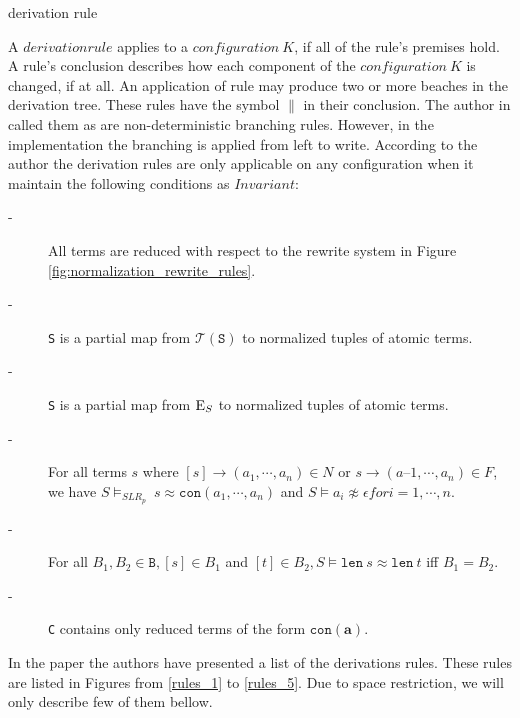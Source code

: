 \begin{definition}{derivation rule}
\end{definition}
A $derivation rule$ applies to a $configuration\ K$, if all of the rule's premises hold. A rule's conclusion describes how each component of the $configuration\ K$ is changed, if at all. An application of rule may produce two or more beaches in the derivation tree. These rules have the symbol $\parallel$ in their conclusion. The author in \cite{main-paper} called them as are non-deterministic branching rules.
However, in the implementation the branching is applied from left to write. According to the author the derivation rules are only applicable on any configuration when it maintain the following conditions as $Invariant$:
\begin{description}			
\item[-] All terms are reduced with respect to the rewrite system in Figure \ref{fig:normalization_rewrite_rules}.
\item[-] \texttt{S} is a partial map from  $\mathcal{T}(\texttt{S})$ to normalized tuples of atomic terms.
\item[-] \texttt{S} is a partial map from \( \textnormal{E}_S \) to normalized tuples of atomic terms.
\item[-] For all terms $s$ where $[s] \to (a_1,\cdots,a_n) \in N$ or $s \to (a–1,\cdots,a_n) \in F$, we have $S \models_{SLR_p} \  s \approx \texttt{con}(a_1,\cdots,a_n)$ and $S \models a_i \not\approx \epsilon for i = 1,\cdots,n $.
\item[-] For all $B_1, B_2 \in \texttt{B}, [s] \in B_1$ and $[t] \in B_2, S \models \texttt{len} \ s \approx \texttt{len} \ t$ iff $B_1 = B_2$.
\item[-] \texttt{C} contains only reduced terms of the form $\texttt{con}(\mathbf{a})$.       	       
\end{description}
 
    In the paper \cite{main-paper} the authors have presented a list of the derivations rules. These rules are listed in Figures from \ref{rules_1} to \ref{rules_5}. Due to space restriction, we will only describe few of them bellow. 
    
